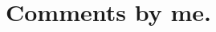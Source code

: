 \documentclass[
10pt, %
a4paper, %
twocolumn, %
landscape %
]{article}
\begin{document}
\section*{Comments by me.}

\renewcommand{\refname}{Reference} %


\end{document}
